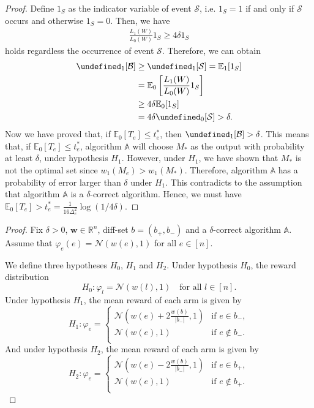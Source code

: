 \documentclass{article}
\newcommand{\Rew}{\varphi}
\newcommand{\E}{\mathbb E}
\newcommand{\RR}{\mathbb R}
\let\Pr\undefined
\DeclareMathOperator{\Pr}{Pr}
\renewcommand{\vec}[1]{\boldsymbol{#1}}
\begin{document}
\begin{spacing}{1.1}
\begin{proof}
Define $1_S$ as the indicator variable of event $\mathcal S$, i.e. $1_S = 1$ if and only if $\mathcal S$ occurs and otherwise $1_S = 0$.
Then, we have
\begin{align*}
\frac{L_1(W)}{L_0(W)} 1_S \ge 4\delta 1_S
\end{align*}
holds regardless the occurrence of event $\mathcal S$.
Therefore, we can obtain
\begin{align*}
\Pr_1[\mathcal B] &\ge \Pr_1[\mathcal S] = \E_1[1_S] \\
				  &= \E_0\left[\frac{L_1(W)}{L_0(W)} 1_S\right] \\
				  &\ge 4\delta \E_0[1_S] \\
				  &= 4\delta \Pr_0[\mathcal S] > \delta.
\end{align*}
Now we have proved that, if $\E_0[T_e] \le t_e^*$, then $\Pr_1[\mathcal B]>\delta$.
This means that, if $\E_0[T_e] \le t_e^*$, algorithm $\mathbb A$ will choose $M_*$ as the output with probability at least $\delta$, under hypothesis $H_1$.
However, under $H_1$, we have shown that $M_*$ is not the optimal set since $w_1(M_e) > w_1(M_*)$.
Therefore, algorithm $\mathbb A$ has a probability of error larger than $\delta$ under $H_1$. 
This contradicts to the assumption that algorithm $\mathbb A$ is a $\delta$-correct algorithm.
Hence, we must have $\E_0[T_e] > t_e^* = \frac{1}{16\Delta_e^2}\log(1/4\delta)$.

\end{proof}

\begin{proof}
Fix $\delta >0$, $\vec w\in \RR^{n}$, diff-set $b=(b_+,b_-)$ and a $\delta$-correct algorithm $\mathbb A$.
Assume that $\Rew_e(e)=\mathcal N(w(e),1)$ for all $e\in[n]$.



We define three hypotheses $H_0$, $H_1$ and $H_2$. 
Under hypothesis $H_0$, the reward distribution 
$$
H_0: \Rew_l = \mathcal N(w(l),1) \quad \text{for all } l \in [n].
$$
Under hypothesis $H_1$, the mean reward of each arm is given by 
$$
H_1: \Rew_e = \begin{cases}
	\mathcal N\left(w(e)+2\frac{w(b)}{|b_-|},1\right) & \text{if } e\in b_-,\\
	\mathcal N(w(e), 1) & \text{if } e\not\in b_-.\\
    \end{cases}
$$
And under hypothesis $H_2$, the mean reward of each arm is given by 
$$
H_2: \Rew_e = \begin{cases}
	\mathcal N\left(w(e)-2\frac{w(b)}{|b_-|},1\right)  & \text{if } e\in b_+,\\
	\mathcal N(w(e), 1)  & \text{if } e\not\in b_+.\\
    \end{cases}
$$


\end{proof}
\end{spacing}
\end{document}
